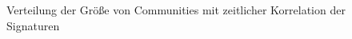 \begin{figure}[th!]
  \caption{Verteilung der Größe von Communities mit zeitlicher
    Korrelation der Signaturen}
  \label{fig:time-corrdist}
\end{figure}

